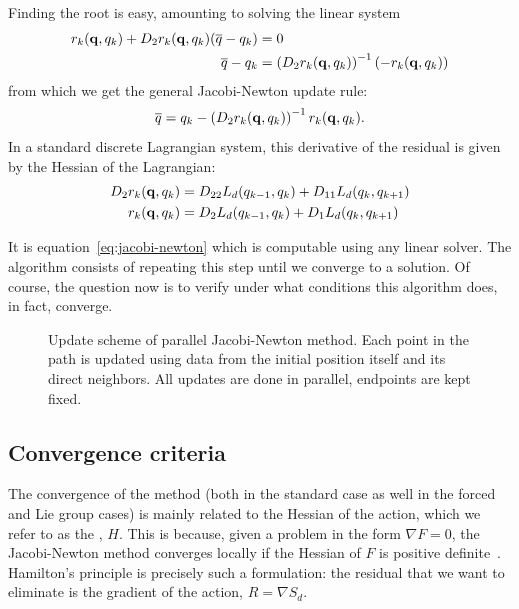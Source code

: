 Finding the root is easy, amounting to solving the linear system
\begin{align*}
	r_k(\mathbf{q}, q_k) + D_{2} r_k(\mathbf{q}, q_k) (\overline{q} - q_k) & = 0                                                                                    \\
	\overline{q} - q_k                                                        & = \left(D_{2} r_k(\mathbf{q}, q_k)\right)^{-1} \left(-r_k(\mathbf{q}, q_k)\right)
\end{align*}
from which we get the general Jacobi-Newton update rule:
\begin{equation}
	\overline{q} = q_k - \left(D_{2} r_k(\mathbf{q}, q_k)\right)^{-1} r_k(\mathbf{q}, q_k).
	\label{eq:jacobi-newton}
\end{equation}
In a standard discrete Lagrangian system, this derivative of the residual is given by the Hessian of the Lagrangian:
\begin{align*}
	D_{2} r_k (\mathbf{q}, q_k) & = D_{22} L_d(q_{k-1}, q_k) + D_{11} L_d(q_k, q_{k+1}) \\
	r_k (\mathbf{q}, q_k)          & = D_{2} L_d(q_{k-1}, q_k) + D_{1} L_d(q_k, q_{k+1})  
\end{align*}

It is equation~\eqref{eq:jacobi-newton} which is computable using any linear solver. The algorithm consists of repeating this step until we converge to a solution. Of course, the question now is to verify under what conditions this algorithm does, in fact, converge.

\begin{figure}[ht]
	\centering
	\vspace{1cm}
	
	\caption{Update scheme of parallel Jacobi-Newton method. Each point in the path is updated using data from the initial position itself and its direct neighbors. All updates are done in parallel, endpoints are kept fixed.}\label{fig:discrete-path-stencil}
\end{figure}

\subsection{Convergence criteria}\label{sec:standard-convergence}

The convergence of the method (both in the standard case as well in the forced and Lie group cases) is mainly related to the Hessian of the action, which we refer to as the , $H$. This is because, given a problem in the form $\nabla F = 0$, the Jacobi-Newton method converges locally if the Hessian of $F$ is positive definite~\cite[Prop. 4.5]{ferraroParallelIterativeMethod2025}. Hamilton's principle is precisely such a formulation: the residual that we want to eliminate is the gradient of the action, $R = \nabla S_d$.

